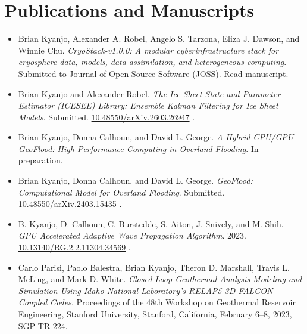 \documentclass[11pt]{article}
\newcommand{\doilink}[1]{%
\href{https://doi.org/#1}{#1}%
}
\begin{document}

\section*{Publications and Manuscripts}

\begin{itemize}[leftmargin=1.2em, itemsep=4pt, topsep=2pt]

\item Brian Kyanjo, Alexander A. Robel, Angelo S. Tarzona, Eliza J. Dawson, and Winnie Chu.
\textit{CryoStack-v1.0.0: A modular cyberinfrastructure stack for cryosphere data, models, data assimilation, and heterogeneous computing}.
Submitted to Journal of Open Source Software (JOSS).
\href{https://github.com/ICESEE-project/CryoStack/blob/joss-v1.0.0/paper/paper.md}{Read manuscript}.

\item Brian Kyanjo and Alexander Robel.
\textit{The Ice Sheet State and Parameter Estimator (ICESEE) Library: Ensemble Kalman Filtering for Ice Sheet Models}.
Submitted.
\doilink{10.48550/arXiv.2603.26947}.

\item Brian Kyanjo, Donna Calhoun, and David L. George.
\textit{A Hybrid CPU/GPU GeoFlood: High-Performance Computing in Overland Flooding}.
In preparation.

\item Brian Kyanjo, Donna Calhoun, and David L. George.
\textit{GeoFlood: Computational Model for Overland Flooding}.
Submitted.
\doilink{10.48550/arXiv.2403.15435}.

\item B. Kyanjo, D. Calhoun, C. Burstedde, S. Aiton, J. Snively, and M. Shih.
\textit{GPU Accelerated Adaptive Wave Propagation Algorithm}.
2023.
\doilink{10.13140/RG.2.2.11304.34569}.

\item Carlo Parisi, Paolo Balestra, Brian Kyanjo, Theron D. Marshall, Travis L. McLing, and Mark D. White.
\textit{Closed Loop Geothermal Analysis Modeling and Simulation Using Idaho National Laboratory's RELAP5-3D-FALCON Coupled Codes}.
Proceedings of the 48th Workshop on Geothermal Reservoir Engineering, Stanford University, Stanford, California, February 6--8, 2023, SGP-TR-224.

\end{itemize}
\end{document}

